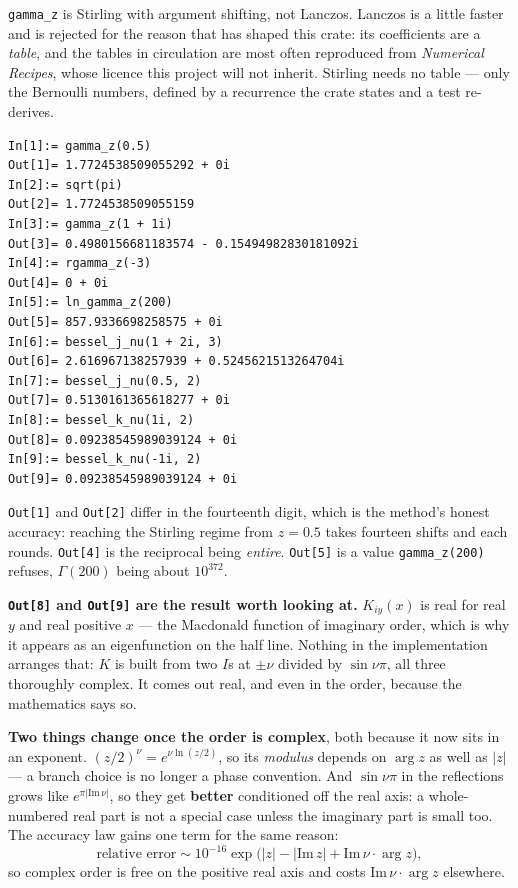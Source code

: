 \documentclass[11pt]{article}
\newcommand{\code}[1]{\texttt{#1}}
\begin{document}
\code{gamma\_z} is Stirling with argument shifting, not Lanczos. Lanczos
is a little faster and is rejected for the reason that has shaped this
crate: its coefficients are a \emph{table}, and the tables in
circulation are most often reproduced from \emph{Numerical Recipes},
whose licence this project will not inherit. Stirling needs no table ---
only the Bernoulli numbers, defined by a recurrence the crate states and
a test re-derives.

\begin{lstlisting}
In[1]:= gamma_z(0.5)
Out[1]= 1.7724538509055292 + 0i
In[2]:= sqrt(pi)
Out[2]= 1.7724538509055159
In[3]:= gamma_z(1 + 1i)
Out[3]= 0.4980156681183574 - 0.15494982830181092i
In[4]:= rgamma_z(-3)
Out[4]= 0 + 0i
In[5]:= ln_gamma_z(200)
Out[5]= 857.9336698258575 + 0i
In[6]:= bessel_j_nu(1 + 2i, 3)
Out[6]= 2.616967138257939 + 0.5245621513264704i
In[7]:= bessel_j_nu(0.5, 2)
Out[7]= 0.5130161365618277 + 0i
In[8]:= bessel_k_nu(1i, 2)
Out[8]= 0.09238545989039124 + 0i
In[9]:= bessel_k_nu(-1i, 2)
Out[9]= 0.09238545989039124 + 0i
\end{lstlisting}

\code{Out[1]} and \code{Out[2]} differ in the fourteenth digit, which is
the method's honest accuracy: reaching the Stirling regime from
$z = 0.5$ takes fourteen shifts and each rounds. \code{Out[4]} is the
reciprocal being \emph{entire}. \code{Out[5]} is a value
\code{gamma\_z(200)} refuses, $\Gamma(200)$ being about $10^{372}$.

\textbf{\code{Out[8]} and \code{Out[9]} are the result worth looking
at.} $K_{iy}(x)$ is real for real $y$ and real positive $x$ --- the
Macdonald function of imaginary order, which is why it appears as an
eigenfunction on the half line. Nothing in the implementation arranges
that: $K$ is built from two $I$s at $\pm\nu$ divided by $\sin\nu\pi$,
all three thoroughly complex. It comes out real, and even in the order,
because the mathematics says so.

\textbf{Two things change once the order is complex}, both because it
now sits in an exponent. $(z/2)^\nu = e^{\nu\ln(z/2)}$, so its
\emph{modulus} depends on $\arg z$ as well as $|z|$ --- a branch choice
is no longer a phase convention. And $\sin\nu\pi$ in the reflections
grows like $e^{\pi|\mathrm{Im}\,\nu|}$, so they get \textbf{better}
conditioned off the real axis: a whole-numbered real part is not a
special case unless the imaginary part is small too. The accuracy law
gains one term for the same reason:
\[
  \text{relative error} \sim 10^{-16}
    \exp\!\big(|z| - |\mathrm{Im}\,z|
      + \mathrm{Im}\,\nu \cdot \arg z\big),
\]
so complex order is free on the positive real axis and costs
$\mathrm{Im}\,\nu \cdot \arg z$ elsewhere.
\end{document}
